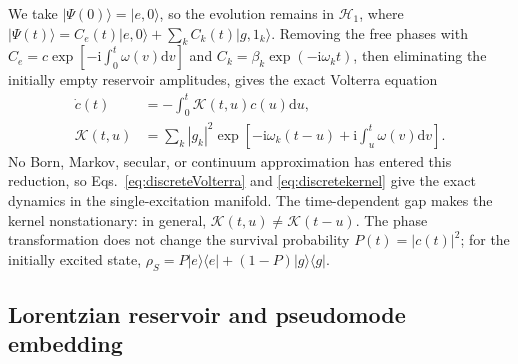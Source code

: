 \documentclass[reprint,superscriptaddress,floatfix,amsmath,amssymb,prresearch,aps]{revtex4-2}
\newcommand{\dd}{\mathrm{d}}
\newcommand{\ii}{\mathrm{i}}
\begin{document}
We take \(|\Psi(0)\rangle=|e,0\rangle\), so the evolution remains in
\(\mathcal H_1\), where
\(|\Psi(t)\rangle=C_e(t)|e,0\rangle+\sum_kC_k(t)|g,1_k\rangle\).
Removing the free phases with
\(C_e=c\exp[-\ii\int_0^t\omega(v)\dd v]\) and
\(C_k=\beta_k\exp(-\ii\omega_kt)\), then eliminating the initially empty
reservoir amplitudes, gives the exact Volterra equation
\begin{align}
\dot c(t)&=-\int_0^t\mathcal K(t,u)c(u)\dd u,
\label{eq:discreteVolterra}\\
\mathcal K(t,u)&=\sum_k|g_k|^2
\exp\!\left[-\ii\omega_k(t-u)
+\ii\int_u^t\omega(v)\dd v\right].
\label{eq:discretekernel}
\end{align}
No Born, Markov, secular, or continuum approximation has entered this
reduction, so Eqs.~\eqref{eq:discreteVolterra} and
\eqref{eq:discretekernel} give the exact dynamics in the single-excitation
manifold. The time-dependent gap makes the kernel nonstationary: in general,
\(\mathcal K(t,u)\neq\mathcal K(t-u)\). The phase transformation does not
change the survival probability \(P(t)=|c(t)|^2\); for the initially excited
state, \(\rho_S=P|e\rangle\langle e|+(1-P)|g\rangle\langle g|\).

\subsection{Lorentzian reservoir and pseudomode embedding}
\end{document}
